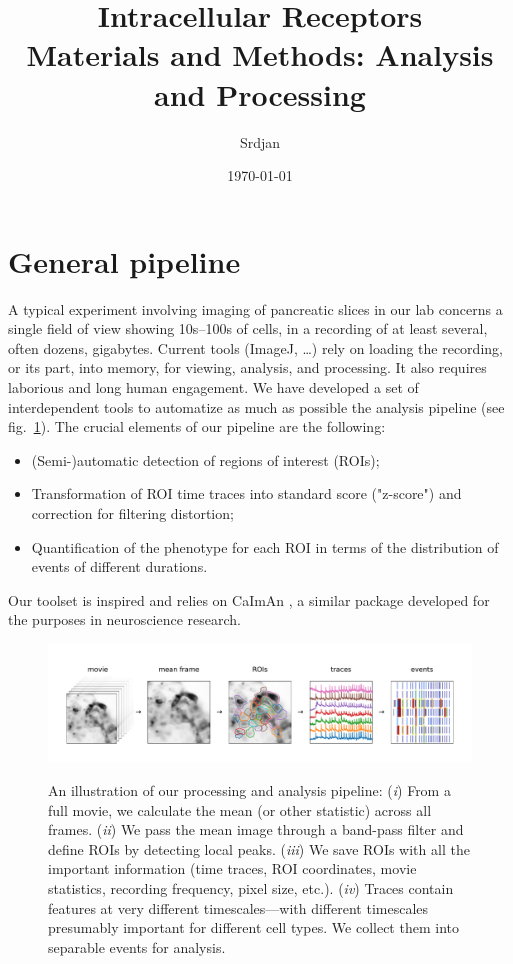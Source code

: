 \documentclass[a4paper,11pt,oneside,]{article}
\title{Intracellular Receptors \\ {\small Materials and Methods: Analysis and Processing}}
\author{Srdjan}
\date{\today}
\begin{document}
\maketitle


\section{General pipeline}

A typical experiment involving imaging of pancreatic slices in our lab concerns a single field of view
showing 10s--100s of cells, in a recording of at least several, often dozens, gigabytes.
Current tools (ImageJ, \dots) rely on loading the recording, or its part, into memory, for viewing, analysis, and processing.
It also requires laborious and long human engagement.
We have developed a set of interdependent tools to automatize as much as possible the analysis pipeline (see fig.~\ref{fig:pipeline}). 
The crucial elements of our pipeline are the following:
\begin{itemize}
\item (Semi-)automatic detection of regions of interest (ROIs);
\item Transformation of ROI time traces into standard score ("z-score") and correction for filtering distortion;
\item Quantification of the phenotype for each ROI in terms of the distribution of events of different durations.
\end{itemize}

Our toolset is inspired and relies on CaImAn \cite{giovannucci2019caiman}, a similar package developed for the purposes in neuroscience research.


\begin{figure}[h]
\centering
\includegraphics[width=\textwidth,trim=1.5cm 1.5cm 15mm 15mm,clip]{figures/pipeline.pdf}
\label{fig:pipeline}
\caption{
An illustration of our processing and analysis pipeline:
({\it i})  From a full movie, we calculate the mean (or other statistic) across all frames.
({\it ii}) We pass the mean image through a band-pass filter and define ROIs by detecting local peaks.
({\it iii}) We save ROIs with all the important information (time traces, ROI coordinates, movie statistics, recording frequency, pixel size, etc.).
({\it iv}) Traces contain features at very different timescales---with different timescales presumably important for different cell types. We collect them into separable events for analysis.
}
\end{figure}
\end{document}
